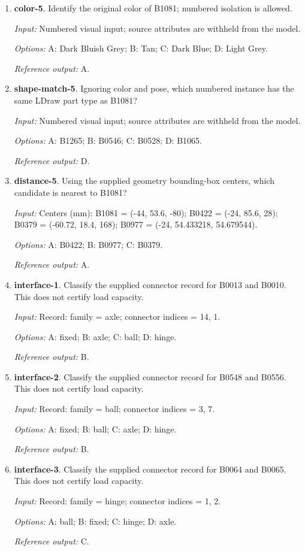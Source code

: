 \begin{enumerate}
\item \textbf{color-5}. Identify the original color of B1081; numbered isolation is allowed.\par {\small \textit{Input:} Numbered visual input; source attributes are withheld from the model. \par\textit{Options:} A: Dark Bluish Grey; B: Tan; C: Dark Blue; D: Light Grey. \par\textit{Reference output:} A.}
\item \textbf{shape-match-5}. Ignoring color and pose, which numbered instance has the same LDraw part type as B1081?\par {\small \textit{Input:} Numbered visual input; source attributes are withheld from the model. \par\textit{Options:} A: B1265; B: B0546; C: B0528; D: B1065. \par\textit{Reference output:} D.}
\item \textbf{distance-5}. Using the supplied geometry bounding-box centers, which candidate is nearest to B1081?\par {\small \textit{Input:} Centers (mm): B1081 = (-44, 53.6, -80); B0422 = (-24, 85.6, 28); B0379 = (-60.72, 18.4, 168); B0977 = (-24, 54.433218, 54.679544). \par\textit{Options:} A: B0422; B: B0977; C: B0379. \par\textit{Reference output:} A.}
\item \textbf{interface-1}. Classify the supplied connector record for B0013 and B0010. This does not certify load capacity.\par {\small \textit{Input:} Record: family = axle; connector indices = 14, 1. \par\textit{Options:} A: fixed; B: axle; C: ball; D: hinge. \par\textit{Reference output:} B.}
\item \textbf{interface-2}. Classify the supplied connector record for B0548 and B0556. This does not certify load capacity.\par {\small \textit{Input:} Record: family = ball; connector indices = 3, 7. \par\textit{Options:} A: fixed; B: ball; C: axle; D: hinge. \par\textit{Reference output:} B.}
\item \textbf{interface-3}. Classify the supplied connector record for B0064 and B0065. This does not certify load capacity.\par {\small \textit{Input:} Record: family = hinge; connector indices = 1, 2. \par\textit{Options:} A: ball; B: fixed; C: hinge; D: axle. \par\textit{Reference output:} C.}

\end{enumerate}
